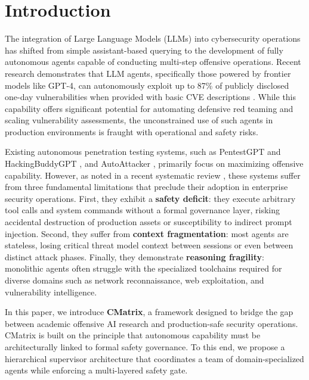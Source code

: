 \documentclass[conference,compsoc]{IEEEtran}
\begin{document}
\section{Introduction}
The integration of Large Language Models (LLMs) into cybersecurity operations has shifted from simple assistant-based querying to the development of fully autonomous agents capable of conducting multi-step offensive operations. Recent research demonstrates that LLM agents, specifically those powered by frontier models like GPT-4, can autonomously exploit up to 87\% of publicly disclosed one-day vulnerabilities when provided with basic CVE descriptions \cite{fang2024}. While this capability offers significant potential for automating defensive red teaming and scaling vulnerability assessments, the unconstrained use of such agents in production environments is fraught with operational and safety risks.

Existing autonomous penetration testing systems, such as PentestGPT \cite{pentestgpt} and HackingBuddyGPT \cite{hackingbuddygpt}, and AutoAttacker \cite{autoattacker}, primarily focus on maximizing offensive capability. However, as noted in a recent systematic review \cite{xu2024sok}, these systems suffer from three fundamental limitations that preclude their adoption in enterprise security operations. First, they exhibit a \textbf{safety deficit}: they execute arbitrary tool calls and system commands without a formal governance layer, risking accidental destruction of production assets or susceptibility to indirect prompt injection. Second, they suffer from \textbf{context fragmentation}: most agents are stateless, losing critical threat model context between sessions or even between distinct attack phases. Finally, they demonstrate \textbf{reasoning fragility}: monolithic agents often struggle with the specialized toolchains required for diverse domains such as network reconnaissance, web exploitation, and vulnerability intelligence.

In this paper, we introduce \textbf{CMatrix}, a framework designed to bridge the gap between academic offensive AI research and production-safe security operations. CMatrix is built on the principle that autonomous capability must be architecturally linked to formal safety governance. To this end, we propose a hierarchical supervisor architecture that coordinates a team of domain-specialized agents while enforcing a multi-layered safety gate.
\end{document}
